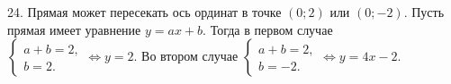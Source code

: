 24. Прямая может пересекать ось ординат в точке $(0;2)$ или $(0;-2).$ Пусть прямая имеет уравнение $y=ax+b.$ Тогда в первом случае $\begin{cases}a+b=2,\\ b=2.\end{cases}\Leftrightarrow y=2.$ Во втором случае $\begin{cases}a+b=2,\\ b=-2.\end{cases}\Leftrightarrow y=4x-2.$\\
